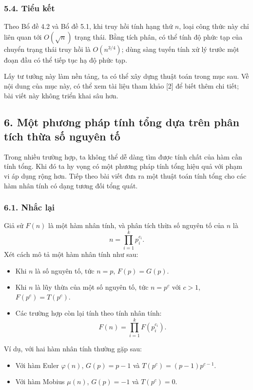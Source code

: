 \documentclass[11pt]{article}
\begin{document}
\subsubsection*{5.4. Tiểu kết}

Theo Bổ đề 4.2 và Bổ đề 5.1, khi truy hồi tính hạng thứ \(n\), loại công thức
này chỉ liên quan tới \(O(\sqrt n)\) trạng thái. Bằng tích phân, có thể tính
độ phức tạp của chuyển trạng thái truy hồi là \(O(n^{3/4})\); dùng sàng tuyến
tính xử lý trước một đoạn đầu có thể tiếp tục hạ độ phức tạp.

Lấy tư tưởng này làm nền tảng, ta có thể xây dựng thuật toán trong mục sau.
Về nội dung của mục này, có thể xem tài liệu tham khảo [2] để biết thêm chi
tiết; bài viết này không triển khai sâu hơn.

\subsection*{6. Một phương pháp tính tổng dựa trên phân tích thừa số nguyên tố}

Trong nhiều trường hợp, ta không thể dễ dàng tìm được tính chất của hàm cần
tính tổng. Khi đó ta hy vọng có một phương pháp tính tổng hiệu quả với phạm vi
áp dụng rộng hơn. Tiếp theo bài viết đưa ra một thuật toán tính tổng cho các
hàm nhân tính có dạng tương đối tổng quát.

\subsubsection*{6.1. Nhắc lại}

Giả sử \(F(n)\) là một hàm nhân tính, và phân tích thừa số nguyên tố của \(n\)
là
\[
  n=\prod_{i=1}^{k} p_i^{c_i}.
\]
Xét cách mô tả một hàm nhân tính như sau:
\begin{itemize}
  \item Khi \(n\) là số nguyên tố, tức \(n=p\), \(F(p)=G(p)\).
  \item Khi \(n\) là lũy thừa của một số nguyên tố, tức \(n=p^c\) với
  \(c>1\), \(F(p^c)=T(p^c)\).
  \item Các trường hợp còn lại tính theo tính nhân tính:
  \[
    F(n)=\prod_{i=1}^{k}F(p_i^{c_i}).
  \]
\end{itemize}

Ví dụ, với hai hàm nhân tính thường gặp sau:
\begin{itemize}
  \item Với hàm Euler \(\varphi(n)\), \(G(p)=p-1\) và
  \(T(p^c)=(p-1)p^{c-1}\).
  \item Với hàm Mobius \(\mu(n)\), \(G(p)=-1\) và \(T(p^c)=0\).
\end{itemize}
\end{document}
